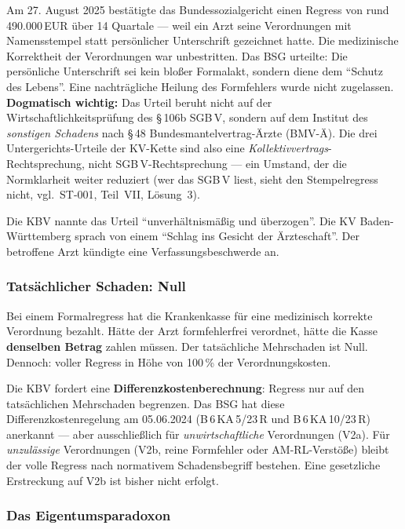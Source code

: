 \documentclass{umbruch-position}
\begin{document}
Am 27. August 2025 bestätigte das Bundessozialgericht einen Regress von rund 490.000\,EUR über 14 Quartale --- weil ein Arzt seine Verordnungen mit Namensstempel statt persönlicher Unterschrift gezeichnet hatte. Die medizinische Korrektheit der Verordnungen war unbestritten. Das BSG urteilte: Die persönliche Unterschrift sei kein bloßer Formalakt, sondern diene dem ``Schutz des Lebens''. Eine nachträgliche Heilung des Formfehlers wurde nicht zugelassen. \textbf{Dogmatisch wichtig:} Das Urteil beruht nicht auf der Wirtschaftlichkeitspr\"ufung des \S\,106b SGB\,V, sondern auf dem Institut des \textit{sonstigen Schadens} nach \S\,48 Bundesmantelvertrag-\"Arzte (BMV-\"A). Die drei Untergerichts-Urteile der KV-Kette sind also eine \textit{Kollektivvertrags}-Rechtsprechung, nicht SGB\,V-Rechtsprechung --- ein Umstand, der die Normklarheit weiter reduziert (\glqq{}wer das SGB\,V liest, sieht den Stempelregress nicht\grqq{}, vgl.\ ST-001, Teil~VII, L\"osung~3).

Die KBV nannte das Urteil ``unverhältnismäßig und überzogen''. Die KV Baden-Württemberg sprach von einem ``Schlag ins Gesicht der Ärzteschaft''. Der betroffene Arzt kündigte eine Verfassungsbeschwerde an.

\subsubsection{Tatsächlicher Schaden: Null}

Bei einem Formalregress hat die Krankenkasse für eine medizinisch korrekte Verordnung bezahlt. Hätte der Arzt formfehlerfrei verordnet, hätte die Kasse \textbf{denselben Betrag} zahlen müssen. Der tatsächliche Mehrschaden ist Null. Dennoch: voller Regress in Höhe von 100\,\% der Verordnungskosten.

Die KBV fordert eine \textbf{Differenzkostenberechnung}: Regress nur auf den tatsächlichen Mehrschaden begrenzen. Das BSG hat diese Differenzkostenregelung am 05.06.2024 (B\,6\,KA\,5/23\,R und B\,6\,KA\,10/23\,R) anerkannt --- aber ausschließlich für \emph{unwirtschaftliche} Verordnungen (V2a). Für \emph{unzulässige} Verordnungen (V2b, reine Formfehler oder AM-RL-Verstöße) bleibt der volle Regress nach normativem Schadensbegriff bestehen. Eine gesetzliche Erstreckung auf V2b ist bisher nicht erfolgt.

\subsubsection{Das Eigentumsparadoxon}
\end{document}

